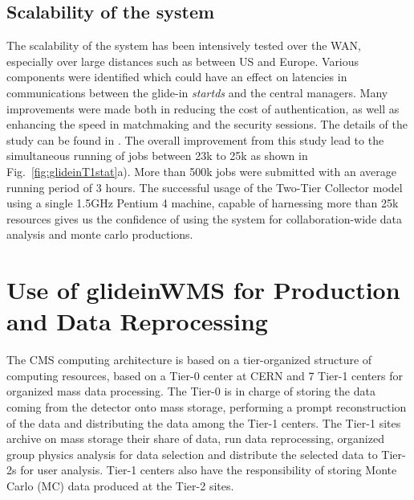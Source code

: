 \documentclass[a4paper]{jpconf}
\begin{document}
\subsection {Scalability of the system}
The scalability of the system has been intensively tested over the WAN, especially over large distances such 
as between US and Europe. Various components were identified which could have an effect on
latencies in communications between the glide-in \emph{startds} and the central managers. Many improvements were
made both in reducing the cost of authentication, as well as enhancing the speed in matchmaking and 
the security sessions. The details of the study can be found in \cite{bib:scalability}. The overall improvement 
from this study lead to the simultaneous running of jobs between 23k to 25k as shown in Fig.~\ref{fig:glideinT1stat}a).
More than 500k jobs were submitted with an average running period of 3 hours. The successful usage
of the Two-Tier Collector model using a single 1.5GHz Pentium 4 machine, capable of harnessing more than 25k 
resources gives us the confidence of using the system for collaboration-wide data analysis and monte carlo 
productions.
\section{Use of glideinWMS for Production and Data Reprocessing }
The CMS computing architecture \cite{bib:cms_computing_arch} is based on a tier-organized structure of computing
resources, based on a Tier-0 center at CERN and 7 Tier-1 centers for organized mass data processing. 
The Tier-0 is in charge of storing the data coming from the detector onto mass storage, performing a prompt 
reconstruction of the data and distributing the data among the Tier-1 centers. The Tier-1 sites archive on
mass storage their share of data, run data reprocessing, organized group physics analysis for data
selection and distribute the selected data to Tier-2s for user analysis. Tier-1 centers also
have the responsibility of storing Monte Carlo (MC) data produced at the Tier-2 sites. 
\end{document}
